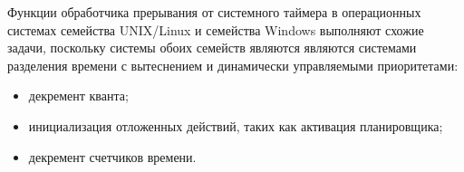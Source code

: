Функции обработчика прерывания от системного таймера в операционных системах семейства UNIX/Linux и семейства Windows выполняют схожие задачи, поскольку системы обоих семейств являются являются системами разделения времени с вытеснением и динамически управляемыми приоритетами:

\begin{itemize}[label*=--]
	\item декремент кванта;
	\item инициализация отложенных действий, таких как активация планировщика;
	\item декремент счетчиков времени.
\end{itemize}